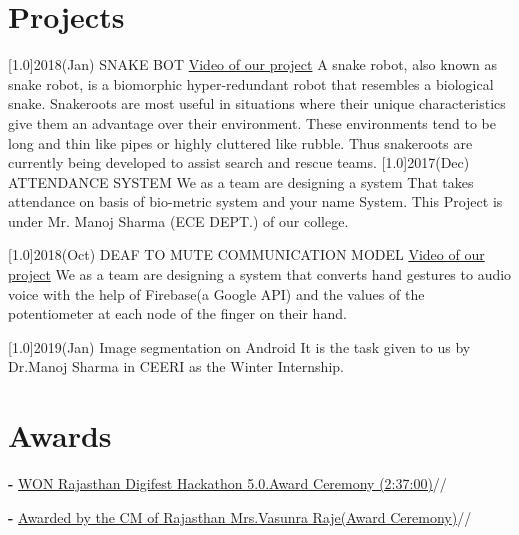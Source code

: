 \documentclass[espanol]{cv-style}     %
\begin{document}
\section{Projects}
  \vspace{-0.2cm}
\begin{entrylist}
\entry
{\scalebox{.8}[1.0]{2018(Jan)}}
{SNAKE BOT}
{\href{https://www.youtube.com/watch?v=288WwUiQuMc&t=5s}{Video of our project}}
{A snake robot, also known as snake robot, is a biomorphic
hyper-redundant robot that resembles a biological snake.
Snakeroots are most useful in situations where their unique characteristics give them
an advantage over their environment. These environments tend to be long and thin
like pipes or highly cluttered like rubble. Thus snakeroots are currently being
developed to assist search and rescue teams.}
\entry
{\scalebox{.8}[1.0]{2017(Dec)}}
{ATTENDANCE SYSTEM}
{           }
{We as a team are designing a system That
takes attendance on basis of bio-metric system and your name System. This
Project is under Mr. Manoj Sharma (ECE DEPT.) of
our college.}

\entry
{\scalebox{.8}[1.0]{2018(Oct)}}
{DEAF TO MUTE COMMUNICATION MODEL}
{\href{https://drive.google.com/open?id=1_bYviurdXB6xN-S8j15YnuRMcF-p-heS}{Video of our project}}
{We as a team are designing a system that
converts hand gestures to audio voice with the help of Firebase(a Google API) and the values of the potentiometer at each node of the finger on their hand.}

\entry
{\scalebox{.8}[1.0]{2019(Jan)}}
{Image segmentation on Android}
{}
{It is the task given to us by Dr.Manoj Sharma in CEERI as the Winter Internship.}

\end{entrylist}
  \vspace{-0.2cm}
\section{Awards}
  \vspace{-0.2cm}
\textbf{-}  {\href{https://www.youtube.com/watch?v=rrQgRlSMAI8&t=9536s}{WON Rajasthan Digifest Hackathon 5.0.Award Ceremony (2:37:00)}}//

\textbf{-}  {\href{https://twitter.com/DIPRRajasthan/status/1022771192904601601/photo/1}{Awarded by the CM of Rajasthan Mrs.Vasunra Raje(Award Ceremony)}}//
\end{document}
